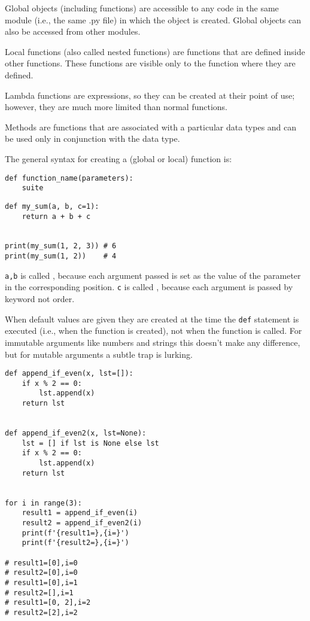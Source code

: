 Global objects (including functions) are accessible to any code in the same module (i.e., the same .py file) in which the object is created.
Global objects can also be accessed from other modules.

Local functions (also called nested functions) are functions that are defined inside other functions.
These functions are visible only to the function where they are defined.




Lambda functions are expressions, so they can be created at their point of use; however, they are much more limited than normal functions.

Methods are functions that are associated with a particular data types and can be used only in conjunction with the data type.



The general syntax for creating a (global or local) function is:
\begin{tcolorbox}
\begin{verbatim}
def function_name(parameters):
    suite
\end{verbatim}
\end{tcolorbox}

\begin{lstlisting}
def my_sum(a, b, c=1):
    return a + b + c


print(my_sum(1, 2, 3)) # 6
print(my_sum(1, 2))    # 4
\end{lstlisting}


\verb|a,b| is called , because each argument passed is set as the value of the parameter in the corresponding position.
\verb|c| is called , because each argument is passed by keyword not order.


When default values are given they are created at the time the \verb|def| statement is executed (i.e., when the function is created), not when the function is called.
For immutable arguments like numbers and strings this doesn’t make any difference, but for mutable arguments a subtle trap is lurking.

\begin{lstlisting}
def append_if_even(x, lst=[]):
    if x % 2 == 0:
        lst.append(x)
    return lst


def append_if_even2(x, lst=None):
    lst = [] if lst is None else lst
    if x % 2 == 0:
        lst.append(x)
    return lst


for i in range(3):
    result1 = append_if_even(i)
    result2 = append_if_even2(i)
    print(f'{result1=},{i=}')
    print(f'{result2=},{i=}')  

# result1=[0],i=0
# result2=[0],i=0
# result1=[0],i=1
# result2=[],i=1
# result1=[0, 2],i=2
# result2=[2],i=2
\end{lstlisting}


